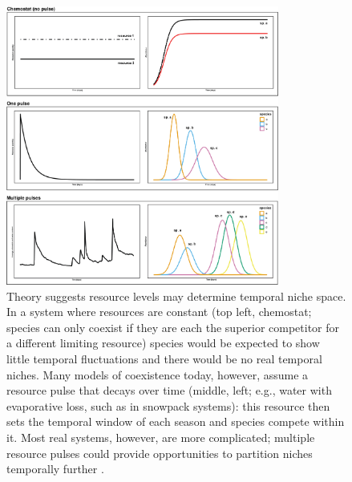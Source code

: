 \documentclass[11pt]{article}
\begin{document}
\clearpage


\begin{figure}[h!]
\centering
\includegraphics[width=0.8\textwidth]{..//figures/figsubmit/sixpanel_concept_increasespp.png}
\caption{Theory suggests resource levels may determine temporal niche space. In a system where resources are constant (top left, chemostat; species can only coexist if they are each the superior competitor for a different limiting resource) species would be expected to show little temporal fluctuations and there would be no real temporal niches. Many models of coexistence today, however, assume a resource pulse that decays over time (middle, left; e.g., water with evaporative loss, such as in snowpack systems): this resource then sets the temporal window of each season and species compete within it. Most real systems, however, are more complicated; multiple resource pulses could provide opportunities to partition niches temporally further \citep[bottom left, taken from Jornada LTER site 302, showing soil moisture at 10 cm depth over the year,][]{jornadadat}.} 

 \label{fig:resource}
\end{figure}
\end{document}

